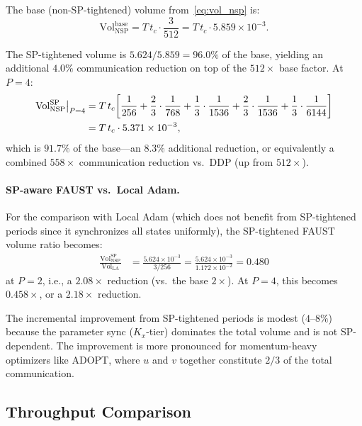 \documentclass{article}
\begin{document}
The base (non-SP-tightened) volume from~\eqref{eq:vol_nsp} is:
\begin{equation}
\text{Vol}_{\text{NSP}}^{\text{base}}
= T\,t_c \cdot \frac{3}{512}
= T\,t_c \cdot 5.859 \times 10^{-3}.
\label{eq:vol_nsp_base_recall}
\end{equation}

The SP-tightened volume is $5.624/5.859 = 96.0\%$ of the base,
yielding an additional $4.0\%$ communication reduction on top of the
$512\times$ base factor. At $P = 4$:
\begin{align}
\text{Vol}_{\text{NSP}}^{\text{SP}}\bigl|_{P=4}
&= T\,t_c \biggl[
  \frac{1}{256}
  + \frac{2}{3} \cdot \frac{1}{768}
  + \frac{1}{3} \cdot \frac{1}{1536}
  + \frac{2}{3} \cdot \frac{1}{1536}
  + \frac{1}{3} \cdot \frac{1}{6144}
\biggr]
\notag \\
&= T\,t_c \cdot 5.371 \times 10^{-3},
\label{eq:vol_nsp_sp_p4}
\end{align}
which is $91.7\%$ of the base---an $8.3\%$ additional reduction, or equivalently
a combined $558\times$ communication reduction vs.\ DDP (up from $512\times$).

\paragraph{SP-aware FAUST vs.\ Local Adam.}
For the comparison with Local Adam (which does not benefit from
SP-tightened periods since it synchronizes all states uniformly),
the SP-tightened FAUST volume ratio becomes:
\begin{align}
\frac{\text{Vol}_{\text{NSP}}^{\text{SP}}}{\text{Vol}_{\text{LA}}}
&= \frac{5.624 \times 10^{-3}}{3/256}
= \frac{5.624 \times 10^{-3}}{1.172 \times 10^{-2}}
= 0.480
\label{eq:nsp_sp_vs_la}
\end{align}
at $P = 2$, i.e., a $2.08\times$ reduction (vs.\ the base $2\times$).
At $P = 4$, this becomes $0.458\times$, or a $2.18\times$ reduction.

The incremental improvement from SP-tightened periods is modest
($4$--$8\%$) because the parameter sync ($K_x$-tier) dominates the
total volume and is not SP-dependent. The improvement is more
pronounced for momentum-heavy optimizers like ADOPT, where $u$ and $v$
together constitute $2/3$ of the total communication.

\subsection{Throughput Comparison}
\end{document}
